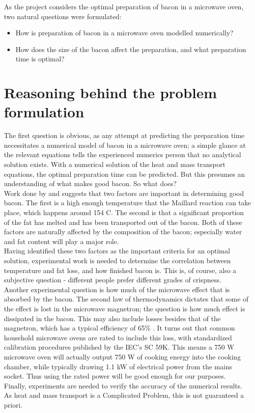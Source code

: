 As the project considers the optimal preparation of bacon in a microwave oven, two natural questions
were formulated:
\begin{itemize}
  \item How is preparation of bacon in a microwave oven modelled numerically?
  \item How does the size of the bacon affect the preparation, and what preparation time is optimal?
\end{itemize}

\section{Reasoning behind the problem formulation}
The first question is obvious, as any attempt at predicting the preparation time necessitates a
numerical model of bacon in a microwave oven; a simple glance at the relevant
equations tells the experienced numerics person that no analytical solution
exists. With a numerical solution of the heat and mass transport equations, the
optimal preparation time can be predicted. But this presumes an understanding of
what makes good bacon. So what does? \\

Work done by \cite{maillard} and \cite{intarwebz} suggests that two factors are important in
determining good bacon. The first is a high enough temperature that the Maillard
reaction can take place, which happens around 154 \textdegree C. The second is that
a significant proportion of the fat has melted and has been transported out of
the bacon. Both of these factors are naturally affected by the composition of
the bacon; especially water and fat content will play a major role. \\

Having identified these two factors as the important criteria for an optimal
solution, experimental work is needed to determine the correlation between
temperature and fat loss, and how finished bacon is. This is, of course, also a
subjective question - different people prefer different grades of crispness.\\

Another experimental question is how much of the microwave effect that is
absorbed by the bacon. The second law of thermodynamics dictates that some of
the effect is lost in the microwave magnetron; the question is how much effect
is dissipated in the bacon. This may also include losses besides that of the
magnetron, which has a typical efficiency of 65\% \cite{namba}. It turns out
that common household microwave ovens are rated to include this loss,
with standardized calibration procedures published by the IEC's SC 59K. This
means a 750 W microwave oven will actually output 750 W of cooking energy into the cooking
chamber, while typically drawing 1.1 kW of electrical power from the mains
socket. Thus using the rated power will be good enough for our purposes.
\\

Finally, experiments are needed to verify the accuracy of the numerical results.
As heat and mass transport is a Complicated Problem, this is not guaranteed a
priori.

\setcounter{secnumdepth}{2}

